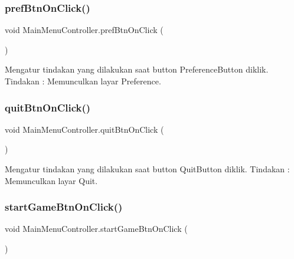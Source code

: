 \subsubsection{\texorpdfstring{pref\+Btn\+On\+Click()}{prefBtnOnClick()}}
{\footnotesize\ttfamily void Main\+Menu\+Controller.\+pref\+Btn\+On\+Click (\begin{DoxyParamCaption}{ }\end{DoxyParamCaption})}



Mengatur tindakan yang dilakukan saat button Preference\+Button diklik. Tindakan \+: Memunculkan layar Preference. 

\hypertarget{class_main_menu_controller_a55f91b182c0d99e5697dd8a45aafb82b}{}\label{class_main_menu_controller_a55f91b182c0d99e5697dd8a45aafb82b} 
\subsubsection{\texorpdfstring{quit\+Btn\+On\+Click()}{quitBtnOnClick()}}
{\footnotesize\ttfamily void Main\+Menu\+Controller.\+quit\+Btn\+On\+Click (\begin{DoxyParamCaption}{ }\end{DoxyParamCaption})}



Mengatur tindakan yang dilakukan saat button Quit\+Button diklik. Tindakan \+: Memunculkan layar Quit. 

\hypertarget{class_main_menu_controller_a3093b0f91bebcc757bd100be4ec19951}{}\label{class_main_menu_controller_a3093b0f91bebcc757bd100be4ec19951} 
\subsubsection{\texorpdfstring{start\+Game\+Btn\+On\+Click()}{startGameBtnOnClick()}}
{\footnotesize\ttfamily void Main\+Menu\+Controller.\+start\+Game\+Btn\+On\+Click (\begin{DoxyParamCaption}{ }\end{DoxyParamCaption})}



